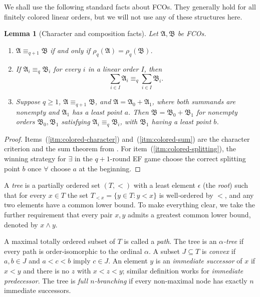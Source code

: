 \documentclass{amsart}
\newtheorem{lemma}{Lemma}
\theoremstyle{definition}
\begin{document}
We shall use the following standard facts about FCOs. They generally hold for all finitely colored linear orders, but we will not use any of these structures here.
\begin{lemma}[Character and composition facts]\label{lem:colored-facts}
Let $\mathfrak A,\mathfrak B$ be FCOs.
    \begin{enumerate}
        \item\label{itm:colored-character} $\mathfrak{A}\equiv_{q+1}\mathfrak{B}$ if and only if $\rho_q(\mathfrak A)=\rho_q(\mathfrak B)$.
        \item\label{itm:colored-sum} If $\mathfrak A_i\equiv_q\mathfrak B_i$ for every $i$ in a linear order $I$, then
        $$\sum_{i\in I}\mathfrak A_i\equiv_q\sum_{i\in I}\mathfrak B_i.$$
        \item\label{itm:colored-splitting} Suppose $q\geq 1$, $\mathfrak A\equiv_{q+1}\mathfrak B$, and $\mathfrak A=\mathfrak A_0+\mathfrak A_1$, where both summands are nonempty and $\mathfrak A_1$ has a least point $a$. Then $\mathfrak B=\mathfrak B_0+\mathfrak B_1$ for nonempty orders $\mathfrak B_0,\mathfrak B_1$ satisfying $\mathfrak A_i\equiv_q\mathfrak B_i$, with $\mathfrak{B}_1$ having a least point $b$.
    \end{enumerate}
\end{lemma}
\begin{proof}
    Items~(\ref{itm:colored-character}) and~(\ref{itm:colored-sum}) are the character criterion and the sum theorem from \cite{Mwesigye2018}. For item~(\ref{itm:colored-splitting}), the winning strategy for $\exists$ in the $q+1$-round EF game choose the correct splitting point $b$ once $\forall$ choose $a$ at the beginning.
\end{proof}

A \emph{tree} is a partially ordered set $(T,<)$ with a least element $\epsilon$ (the \emph{root}) such that for every $x\in T$ the set $T_{<x}=\{y\in T:y<x\}$ is well‑ordered by $<$, and any two elements have a common lower bound. To make everything clear, we take the further requirement that every pair $x,y$ admits a greatest common lower bound, denoted by $x\wedge y$.

A maximal totally ordered subset of $T$ is called a \emph{path}. The tree is an \emph{$\alpha$-tree} if every path is order‑isomorphic to the ordinal $\alpha$. A subset $J\subseteq T$ is \emph{convex} if $a,b\in J$ and $a<c<b$ imply $c\in J$. An element $y$ is an \emph{immediate successor} of $x$ if $x<y$ and there is no $z$ with $x<z<y$; similar definition works for \emph{immediate predecessor}. The tree is \emph{full $n$-branching} if every non‑maximal node has exactly $n$ immediate successors.
\end{document}
